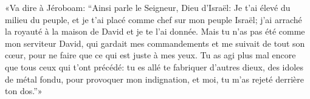 «Va dire à Jéroboam: “Ainsi parle le Seigneur, Dieu d’Israël:
	Je t’ai élevé du milieu du peuple, et je t’ai placé comme chef sur mon peuple Israël;
	j’ai arraché la royauté à la maison de David et je te l’ai donnée.
Mais tu n’as pas été comme mon serviteur David,
	qui gardait mes commandements et me suivait de tout son cœur,
	pour ne faire que ce qui est juste à mes yeux.
Tu as agi plus mal encore que tous ceux qui t’ont précédé:
	tu es allé te fabriquer d’autres dieux, des idoles de métal fondu,
	pour provoquer mon indignation,
	et moi, tu m’as rejeté derrière ton dos.”»
